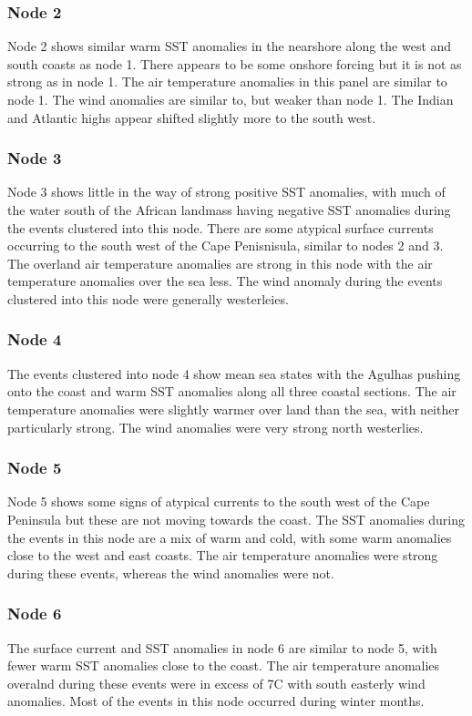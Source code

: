 \documentclass[a4paper,10pt,review]{elsarticle}
\begin{document}
\subsubsection{Node 2}
Node 2 shows similar warm SST anomalies in the nearshore along the west and south coasts as node 1. There appears to be some onshore forcing but it is not as strong as in node 1. The air temperature anomalies in this panel are similar to node 1. The wind anomalies are similar to, but weaker than node 1. The Indian and Atlantic highs appear shifted slightly more to the south west.

\subsubsection{Node 3}
Node 3 shows little in the way of strong positive SST anomalies, with much of the water south of the African landmass having negative SST anomalies during the events clustered into this node. There are some atypical surface currents occurring to the south west of the Cape Penisnisula, similar to nodes 2 and 3. The overland air temperature anomalies are strong in this node with the air temperature anomalies over the sea less. The wind anomaly during the events clustered into this node were generally westerleies.

\subsubsection{Node 4}
The events clustered into node 4 show mean sea states with the Agulhas pushing onto the coast and warm SST anomalies along all three coastal sections. The air temperature anomalies were slightly warmer over land than the sea, with neither particularly strong. The wind anomalies were very strong north westerlies.

\subsubsection{Node 5}
Node 5 shows some signs of atypical currents to the south west of the Cape Peninsula but these are not moving towards the coast. The SST anomalies during the events in this node are a mix of warm and cold, with some warm anomalies close to the west and east coasts. The air temperature anomalies were strong during these events, whereas the wind anomalies were not.

\subsubsection{Node 6}
The surface current and SST anomalies in node 6 are similar to node 5, with fewer warm SST anomalies close to the coast. The air temperature anomalies overalnd during these events were in excess of 7\degree C with south easterly wind anomalies. Most of the events in this node occurred during winter months.
\end{document}

